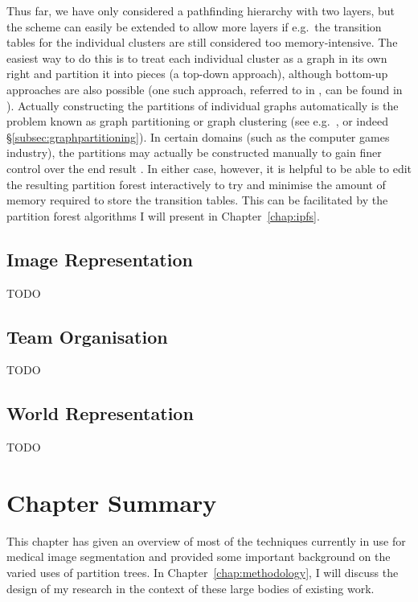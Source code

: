 Thus far, we have only considered a pathfinding hierarchy with two layers, but the scheme can easily be extended to allow more layers if e.g.~the transition tables for the individual clusters are still considered too memory-intensive. The easiest way to do this is to treat each individual cluster as a graph in its own right and partition it into pieces (a top-down approach), although bottom-up approaches are also possible (one such approach, referred to in \cite{kim98}, can be found in \cite{jing96}). Actually constructing the partitions of individual graphs automatically is the problem known as graph partitioning or graph clustering (see e.g.~\cite{huang96,jing98}, or indeed \S\ref{subsec:graphpartitioning}). In certain domains (such as the computer games industry), the partitions may actually be constructed manually to gain finer control over the end result \cite{dickheiser04}. In either case, however, it is helpful to be able to edit the resulting partition forest interactively to try and minimise the amount of memory required to store the transition tables. This can be facilitated by the partition forest algorithms I will present in Chapter~\ref{chap:ipfs}.

\subsection{Image Representation}

TODO

\subsection{Team Organisation}

TODO

\subsection{World Representation}

TODO

\section{Chapter Summary}

This chapter has given an overview of most of the techniques currently in use for medical image segmentation and provided some important background on the varied uses of partition trees. In Chapter~\ref{chap:methodology}, I will discuss the design of my research in the context of these large bodies of existing work.
